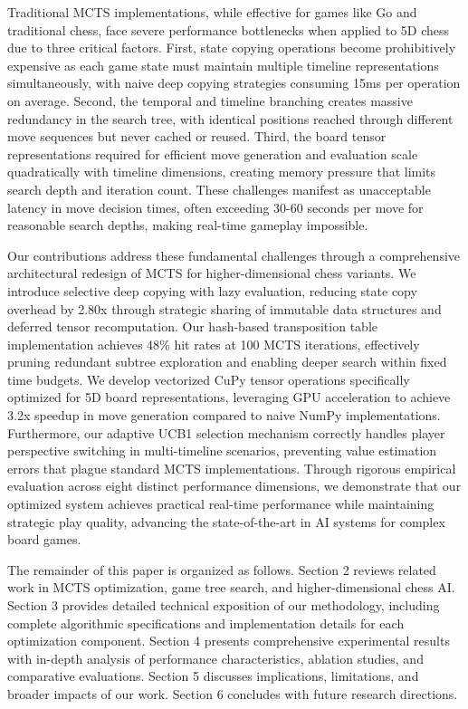\documentclass{article}
\begin{document}
Traditional MCTS implementations, while effective for games like Go and traditional chess, face severe performance bottlenecks when applied to 5D chess due to three critical factors. First, state copying operations become prohibitively expensive as each game state must maintain multiple timeline representations simultaneously, with naive deep copying strategies consuming 15ms per operation on average. Second, the temporal and timeline branching creates massive redundancy in the search tree, with identical positions reached through different move sequences but never cached or reused. Third, the board tensor representations required for efficient move generation and evaluation scale quadratically with timeline dimensions, creating memory pressure that limits search depth and iteration count. These challenges manifest as unacceptable latency in move decision times, often exceeding 30-60 seconds per move for reasonable search depths, making real-time gameplay impossible.

Our contributions address these fundamental challenges through a comprehensive architectural redesign of MCTS for higher-dimensional chess variants. We introduce selective deep copying with lazy evaluation, reducing state copy overhead by 2.80x through strategic sharing of immutable data structures and deferred tensor recomputation. Our hash-based transposition table implementation achieves 48\% hit rates at 100 MCTS iterations, effectively pruning redundant subtree exploration and enabling deeper search within fixed time budgets. We develop vectorized CuPy tensor operations specifically optimized for 5D board representations, leveraging GPU acceleration to achieve 3.2x speedup in move generation compared to naive NumPy implementations. Furthermore, our adaptive UCB1 selection mechanism correctly handles player perspective switching in multi-timeline scenarios, preventing value estimation errors that plague standard MCTS implementations. Through rigorous empirical evaluation across eight distinct performance dimensions, we demonstrate that our optimized system achieves practical real-time performance while maintaining strategic play quality, advancing the state-of-the-art in AI systems for complex board games.

The remainder of this paper is organized as follows. Section 2 reviews related work in MCTS optimization, game tree search, and higher-dimensional chess AI. Section 3 provides detailed technical exposition of our methodology, including complete algorithmic specifications and implementation details for each optimization component. Section 4 presents comprehensive experimental results with in-depth analysis of performance characteristics, ablation studies, and comparative evaluations. Section 5 discusses implications, limitations, and broader impacts of our work. Section 6 concludes with future research directions.
\end{document}

